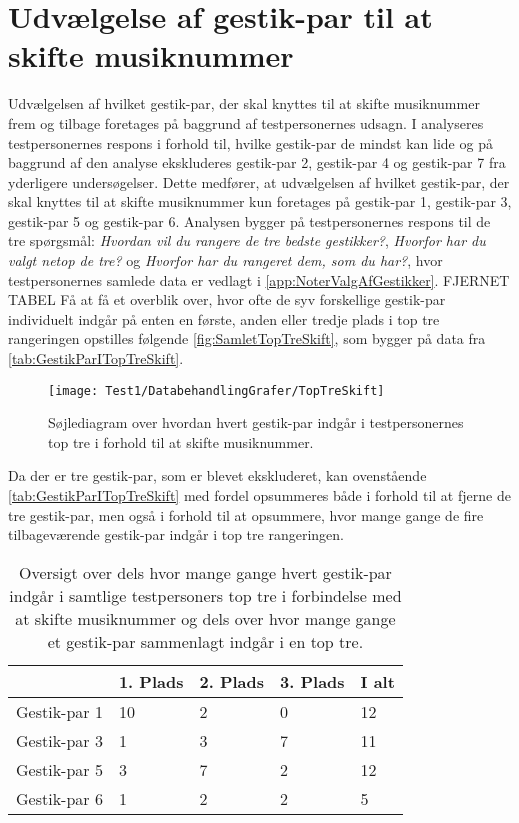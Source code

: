 \section{Udvælgelse af gestik-par til at skifte musiknummer}
\label{TestresultaterSkiftMusiknummer}
%
Udvælgelsen af hvilket gestik-par, der skal knyttes til at skifte musiknummer frem og tilbage foretages på baggrund af testpersonernes udsagn. I  analyseres testpersonernes respons i forhold til, hvilke gestik-par de mindst kan lide og på baggrund af den analyse ekskluderes gestik-par 2, gestik-par 4 og gestik-par 7 fra yderligere undersøgelser. Dette medfører, at udvælgelsen af hvilket gestik-par, der skal knyttes til at skifte musiknummer kun foretages på gestik-par 1, gestik-par 3, gestik-par 5 og gestik-par 6. Analysen bygger på testpersonernes respons til de tre spørgsmål: \textit{Hvordan vil du rangere de tre bedste gestikker?}, \textit{Hvorfor har du valgt netop de tre?} og \textit{Hvorfor har du rangeret dem, som du har?}, hvor testpersonernes samlede data er vedlagt i \autoref{app:NoterValgAfGestikker}.\blankline
%  
FJERNET TABEL 
%
Få at få et overblik over, hvor ofte de syv forskellige gestik-par individuelt indgår på enten en første, anden eller tredje plads i top tre rangeringen opstilles følgende \autoref{fig:SamletTopTreSkift}, som bygger på data fra \autoref{tab:GestikParITopTreSkift}. 
%
\begin{figure}[H]
	\centering
	\texttt{[image: Test1/DatabehandlingGrafer/TopTreSkift]}
	\caption{Søjlediagram over hvordan hvert gestik-par indgår i testpersonernes top tre i forhold til at skifte musiknummer.}
	\label{fig:SamletTopTreSkift}
\end{figure}
\noindent
%
Da der er tre gestik-par, som er blevet ekskluderet, kan ovenstående  \autoref{tab:GestikParITopTreSkift} med fordel opsummeres både i forhold til at fjerne de tre gestik-par, men også i forhold til at opsummere, hvor mange gange de fire tilbageværende gestik-par indgår i top tre rangeringen. 
%
\begin{table}[H]
	\centering
	\begin{tabular}{ | p{2.4cm} | p{2.4cm} | p{2.4cm} | p{2.4cm} |p{2.4cm}|}
		\hline
		& 1. Plads & 2. Plads & 3. Plads & I alt \\ \hline
		Gestik-par 1 & 10 & 2 & 0 & 12\\ \hline
		Gestik-par 3 & 1 & 3 & 7 & 11\\ \hline
		Gestik-par 5 & 3 & 7 & 2 & 12\\ \hline 
		Gestik-par 6 & 1 & 2 & 2 & 5\\ \hline
	\end{tabular}
	\caption{Oversigt over dels hvor mange gange hvert gestik-par indgår i samtlige testpersoners top tre i forbindelse med at skifte musiknummer og dels over hvor mange gange et gestik-par sammenlagt indgår i en top tre.}
	\label{tab:GestikParITopTreSkiftOversigt}
\end{table}
